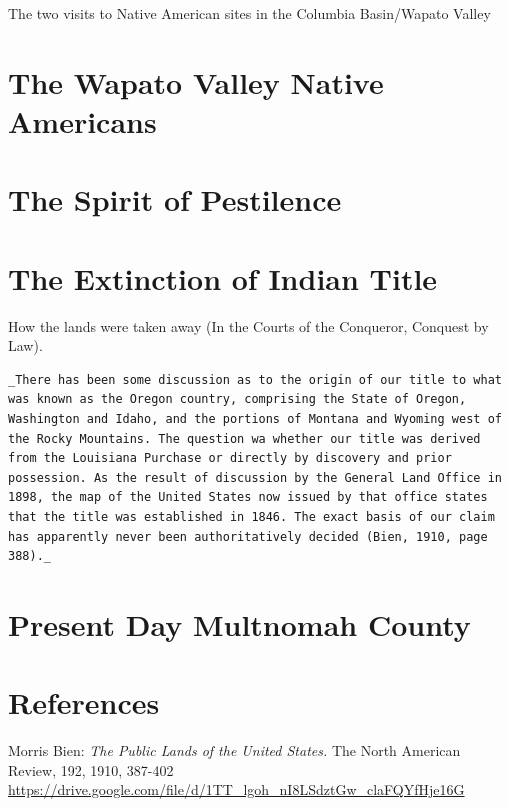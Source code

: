 \documentclass[
  12pt,
]{book}
\begin{document}
The two visits to Native American sites in the Columbia Basin/Wapato Valley

\hypertarget{the-wapato-valley-native-americans}{%
\section{The Wapato Valley Native Americans}\label{the-wapato-valley-native-americans}}

\hypertarget{the-spirit-of-pestilence}{%
\section{The Spirit of Pestilence}\label{the-spirit-of-pestilence}}

\hypertarget{the-extinction-of-indian-title}{%
\section{The Extinction of Indian Title}\label{the-extinction-of-indian-title}}

How the lands were taken away (In the Courts of the Conqueror, Conquest by Law).

\begin{verbatim}
_There has been some discussion as to the origin of our title to what was known as the Oregon country, comprising the State of Oregon, Washington and Idaho, and the portions of Montana and Wyoming west of the Rocky Mountains. The question wa whether our title was derived from the Louisiana Purchase or directly by discovery and prior possession. As the result of discussion by the General Land Office in 1898, the map of the United States now issued by that office states that the title was established in 1846. The exact basis of our claim has apparently never been authoritatively decided (Bien, 1910, page 388)._
\end{verbatim}

\hypertarget{present-day-multnomah-county}{%
\section{Present Day Multnomah County}\label{present-day-multnomah-county}}

\hypertarget{references-1}{%
\section{References}\label{references-1}}

Morris Bien: \emph{The Public Lands of the United States.}
The North American Review, 192, 1910, 387-402
\url{https://drive.google.com/file/d/1TT_lgoh_nI8LSdztGw_claFQYfHje16G}
\end{document}
